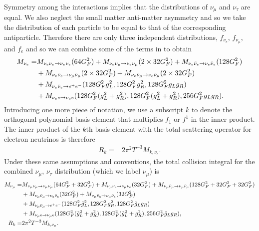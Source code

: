 Symmetry among the interactions implies that the distributions of $\nu_\mu$ and $\nu_\tau$ are equal.  We also neglect the small matter anti-matter asymmetry and so we take the distribution of each particle to be equal to that of the corresponding antiparticle.  Therefore there are only three independent distributions, $f_{\nu_e}$, $f_{\nu_\mu}$, and $f_e$ and so we can combine some of the terms in  to obtain
\begin{align}
M_{\nu_e}=&M_{\nu_e\nu_e\rightarrow\nu_e\nu_e}(64G_F^2)+M_{\nu_e\nu_\mu\rightarrow\nu_e\nu_\mu}(2\times 32 G_F^2)+M_{\nu_e\bar\nu_e\rightarrow\nu_e\bar\nu_e}(128G_F^2)  \\
&+M_{\nu_e\bar\nu_e\rightarrow\nu_\mu\bar\nu_\mu}(2\times 32G_F^2)+M_{\nu_e\bar\nu_\mu\rightarrow\nu_e\bar\nu_\mu}(2\times 32 G_F^2)\notag\\
&+M_{\nu_e\bar\nu_e\rightarrow e^+e^-}(128G_F^2g_L^2,128G_F^2g_R^2,128G_F^2g_Lg_R)\notag\\
&+M_{\nu_e e\rightarrow\nu_e e}(128 G_F^2( g_L^2+g_R^2),128 G_F^2 (g_L^2+ g_R^2),256G_F^2g_Lg_R)\notag.
\end{align}
Introducing one more piece of notation, we use a subscript $k$ to denote the orthogonal polynomial basis element that multiplies $f_1$ or $f^1$ in the inner product.  The inner product of the $k$th basis element with the total scattering operator for electron neutrinos is therefore 
\begin{align}
R_k=&2\pi^2T^{-3} M_{k,\nu_e}.
\end{align}
Under these same assumptions and conventions, the total collision integral for the combined $\nu_\mu$, $\nu_\tau$ distribution (which we label $\nu_\mu$) is
\begin{align}
M_{\nu_\mu}=&M_{\nu_\mu\nu_\mu\rightarrow\nu_\mu\nu_\mu}(64G_F^2+32G_F^2)+M_{\nu_\mu\nu_e\rightarrow\nu_\mu\nu_e}(32 G_F^2)+M_{\nu_\mu\bar\nu_\mu\rightarrow\nu_\mu\bar\nu_\mu}(128G_F^2+32G_F^2+32G_F^2) \notag \\
&+M_{\nu_\mu\bar\nu_\mu\rightarrow\nu_e\bar\nu_e}(32G_F^2)+M_{\nu_\mu\bar\nu_e\rightarrow\nu_\mu\bar\nu_e}( 32 G_F^2)\notag\\
&+M_{\nu_\mu\bar\nu_\mu\rightarrow e^+e^-}(128G_F^2\tilde g_L^2,128G_F^2g_R^2,128G_F^2\tilde g_Lg_R)\notag\\
&+M_{\nu_\mu e\rightarrow\nu_\mu e}(128 G_F^2(\tilde  g_L^2+g_R^2),128 G_F^2 (\tilde g_L^2+ g_R^2),256G_F^2\tilde g_Lg_R),\\
R_k=&2\pi^2T^{-3} M_{k,\nu_\mu}.
\end{align}

